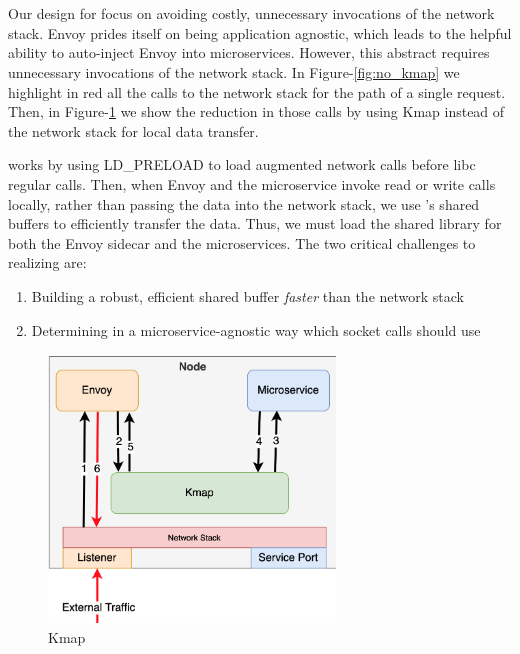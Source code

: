 \section{\sysname}
\label{sec:design}
Our design for \sysname focus on avoiding costly, unnecessary invocations of the network stack.
Envoy prides itself on being application agnostic, which leads to the helpful ability to auto-inject Envoy into microservices.
However, this abstract requires unnecessary invocations of the network stack.
In Figure-\ref{fig:no_kmap} we highlight in red all the calls to the network stack for the path of a single request.
Then, in Figure-\ref{fig:kmap} we show the reduction in those calls by using Kmap instead of the network stack for local data transfer.

\sysname works by using LD\_PRELOAD to load augmented network calls before libc regular calls.
Then, when Envoy and the microservice invoke read or write calls locally, rather than passing the data
into the network stack, we use \sysname's shared buffers to efficiently transfer the data.
Thus, we must load the shared library for both the Envoy sidecar and the microservices.
The two critical challenges to realizing \sysname are:
\begin{enumerate}
    \item Building a robust, efficient shared buffer \textit{faster} than the network stack
    \item Determining in a microservice-agnostic way which socket calls should use \sysname
\end{enumerate}

\begin{figure}[!htb]
    \begin{minipage}{0.5\textwidth}
        \centering
        \includegraphics[keepaspectratio=true,width=3in]{figures/design/kmap.png}
        \caption{Kmap}
        \label{fig:kmap}
    \end{minipage}%
\end{figure}

